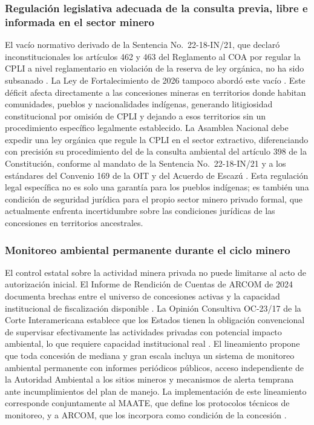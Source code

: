 \subsubsection{Regulación legislativa adecuada de la consulta previa, libre e informada en el sector minero}

El vacío normativo derivado de la Sentencia No.\ 22-18-IN/21, que declaró inconstitucionales los artículos 462 y 463 del Reglamento al COA por regular la CPLI a nivel reglamentario en violación de la reserva de ley orgánica, no ha sido subsanado \parencite{cce_22_18_in_21}. La Ley de Fortalecimiento de 2026 tampoco abordó este vacío \parencite{ley_fortalecimiento_2026}. Este déficit afecta directamente a las concesiones mineras en territorios donde habitan comunidades, pueblos y nacionalidades indígenas, generando litigiosidad constitucional por omisión de CPLI y dejando a esos territorios sin un procedimiento específico legalmente establecido. La Asamblea Nacional debe expedir una ley orgánica que regule la CPLI en el sector extractivo, diferenciando con precisión su procedimiento del de la consulta ambiental del artículo 398 de la Constitución, conforme al mandato de la Sentencia No.\ 22-18-IN/21 y a los estándares del Convenio 169 de la OIT y del Acuerdo de Escazú \parencite{cce_22_18_in_21,acuerdo_escazu_2018}. Esta regulación legal específica no es solo una garantía para los pueblos indígenas; es también una condición de seguridad jurídica para el propio sector minero privado formal, que actualmente enfrenta incertidumbre sobre las condiciones jurídicas de las concesiones en territorios ancestrales.

\subsubsection{Monitoreo ambiental permanente durante el ciclo minero}

El control estatal sobre la actividad minera privada no puede limitarse al acto de autorización inicial. El Informe de Rendición de Cuentas de ARCOM de 2024 documenta brechas entre el universo de concesiones activas y la capacidad institucional de fiscalización disponible \parencite{arcom_rendicion_cuentas_2024}. La Opinión Consultiva OC-23/17 de la Corte Interamericana establece que los Estados tienen la obligación convencional de supervisar efectivamente las actividades privadas con potencial impacto ambiental, lo que requiere capacidad institucional real \parencite{corte_idh_oc23_2017}. El lineamiento propone que toda concesión de mediana y gran escala incluya un sistema de monitoreo ambiental permanente con informes periódicos públicos, acceso independiente de la Autoridad Ambiental a los sitios mineros y mecanismos de alerta temprana ante incumplimientos del plan de manejo. La implementación de este lineamiento corresponde conjuntamente al MAATE, que define los protocolos técnicos de monitoreo, y a ARCOM, que los incorpora como condición de la concesión \parencite{arcom_resolucion_0029_2025}.

